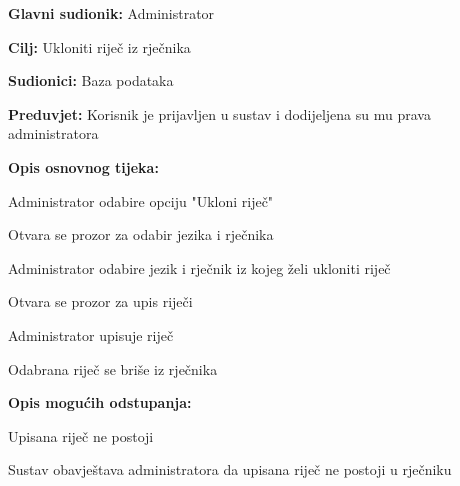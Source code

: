 					\noindent {}
					\begin{packed_item}
	
						\item \textbf{Glavni sudionik: }Administrator
						\item  \textbf{Cilj:} Ukloniti riječ iz rječnika
						\item  \textbf{Sudionici:} Baza podataka
						\item  \textbf{Preduvjet:} Korisnik je prijavljen u sustav i dodijeljena su mu prava administratora
						\item  \textbf{Opis osnovnog tijeka:}
						
						\item[] \begin{packed_enum}
	
							\item Administrator odabire opciju "Ukloni riječ"
							\item Otvara se prozor za odabir jezika i rječnika
							\item Administrator odabire jezik i rječnik iz kojeg želi ukloniti riječ
							\item Otvara se prozor za upis riječi
							\item Administrator upisuje riječ
							\item Odabrana riječ se briše iz rječnika
						\end{packed_enum}

						\item  \textbf{Opis mogućih odstupanja:}
						
						\item[] \begin{packed_item}
	
							\item[5.a] Upisana riječ ne postoji
							\item[] \begin{packed_enum}
								
								\item Sustav obavještava administratora da upisana riječ ne postoji u rječniku
							\end{packed_enum}
						\end{packed_item}
						
					\end{packed_item}


